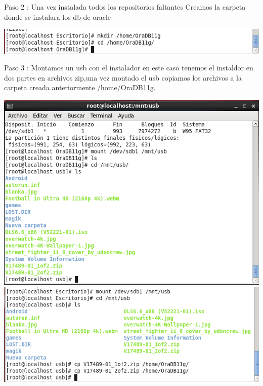 \documentclass[12pt,letterpaper]{article}
\begin{document}
Paso 2 : Una vez instalada todos los repositorios faltantes Creamos la carpeta donde se instalara los db de oracle

\begin{center}
\includegraphics[width=15cm]{./oraclelinux/4.png}
\end{center}
Paso 3 : Montamos un usb con el instalador en este caso tenemos el instaldor en dos partes en archivos zip,una vez montado el usb copiamos los archivos a la carpeta creada anteriormente /home/OraDB11g.

\begin{center}
\includegraphics[width=15cm]{./oraclelinux/5.png}
\includegraphics[width=15cm]{./oraclelinux/6.png}
\end{center}
\end{document}
